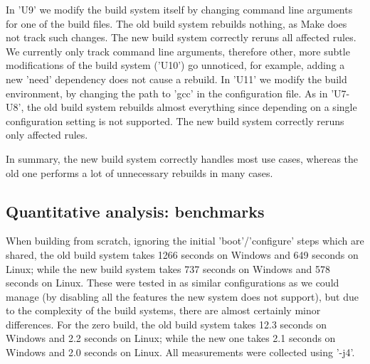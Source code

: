 In \lst'U9' we modify the build system itself by changing command line
arguments for one of the build files. The old build system rebuilds nothing,
as Make does not track such changes. The new build system correctly reruns all
affected rules. We currently only track command line arguments, therefore other,
more subtle modifications of the build system (\lst'U10') go unnoticed, for
example, adding a new \lst'need' dependency does not cause a rebuild.
In \lst'U11' we modify the build environment, by changing the path to \lst'gcc'
in the configuration file. As in \lst'U7-U8', the old build system rebuilds
almost everything since depending on a single configuration setting is not
supported. The new build system correctly reruns only affected rules.

%
%

In summary, the new build system correctly handles most use cases, whereas
the old one performs a lot of unnecessary rebuilds in many cases.

\subsection{Quantitative analysis: benchmarks\label{sec:benchmarks}}

When building from scratch, ignoring the initial \lst'boot'/\lst'configure'
steps which are shared, the old build system takes 1266 seconds on Windows and
649 seconds on Linux; while the new build system takes 737 seconds on Windows and
578 seconds on Linux. These were tested in as similar configurations as we could
manage (by disabling all the features the new system does not support),
but due to the complexity of the build systems, there are almost certainly
minor differences. For the zero build, the old build system takes 12.3
seconds on Windows and 2.2 seconds on Linux; while the new one takes
2.1 seconds on Windows and 2.0 seconds on Linux. All measurements were collected
using \lst'-j4'.

